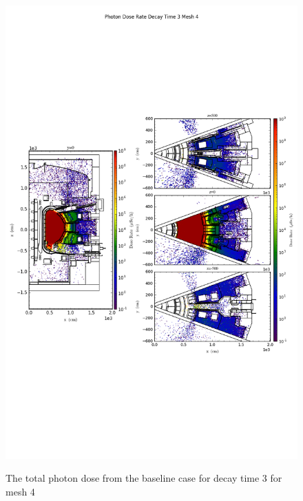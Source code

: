 \begin{figure}[ht!]
\centering
\includegraphics[trim={0cm 9cm 0cm 10cm},clip,scale=0.75]{../plots/final_model_nob4c/Photon_Dose_Rate_Decay_Time_3_Mesh_4.png}
\label{fig:photons_dc3_no4bc_m4_flux}
\caption{The total photon dose from the baseline case for decay time 3 for mesh 4}
\end{figure}
